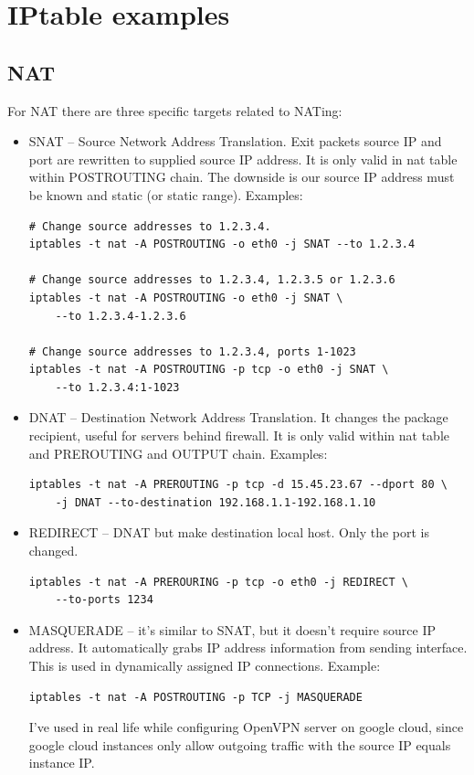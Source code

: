 \documentclass[times, utf8, seminar, english]{fer}
\begin{document}
\chapter{IPtable examples}

\section{NAT}
\label{sec:NAT}

For NAT there are three specific targets related to NATing:
\begin{itemize}
    \item SNAT -- Source Network Address Translation. Exit packets source IP and port are rewritten to supplied source IP address. It is only valid in nat table within POSTROUTING chain. The downside is our source IP address must be known and static (or static range). Examples:
    \begin{verbatim}
# Change source addresses to 1.2.3.4.
iptables -t nat -A POSTROUTING -o eth0 -j SNAT --to 1.2.3.4

# Change source addresses to 1.2.3.4, 1.2.3.5 or 1.2.3.6
iptables -t nat -A POSTROUTING -o eth0 -j SNAT \
    --to 1.2.3.4-1.2.3.6

# Change source addresses to 1.2.3.4, ports 1-1023
iptables -t nat -A POSTROUTING -p tcp -o eth0 -j SNAT \
    --to 1.2.3.4:1-1023
    \end{verbatim}
    \item DNAT -- Destination Network Address Translation. It changes the package recipient, useful for servers behind firewall. It is only valid within nat table and PREROUTING and OUTPUT chain. Examples:
    \begin{verbatim}
iptables -t nat -A PREROUTING -p tcp -d 15.45.23.67 --dport 80 \
    -j DNAT --to-destination 192.168.1.1-192.168.1.10
    \end{verbatim}
    \item REDIRECT -- DNAT but make destination local host. Only the port is changed.
    \begin{verbatim}
iptables -t nat -A PREROURING -p tcp -o eth0 -j REDIRECT \
    --to-ports 1234
    \end{verbatim}
    \item MASQUERADE -- it's similar to SNAT, but it doesn't require source IP address. It automatically grabs IP address information from sending interface. This is used in dynamically assigned IP connections. Example:
    \begin{verbatim}
iptables -t nat -A POSTROUTING -p TCP -j MASQUERADE
    \end{verbatim}
    I've used in real life while configuring OpenVPN server on google cloud, since google cloud instances only allow outgoing traffic with the source IP equals instance IP.
\end{itemize}
\end{document}
